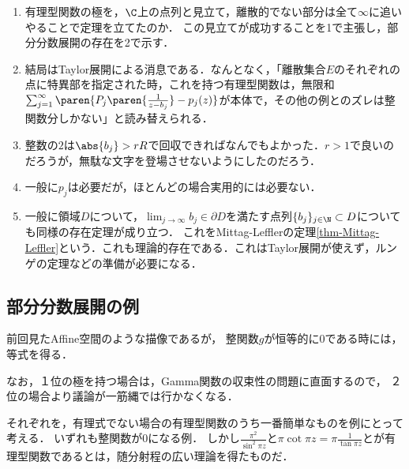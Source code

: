 \documentclass[uplatex, dvipdfmx]{jsreport}
\begin{document}
\begin{remarks}\mbox{}
    \begin{enumerate}
        \item 有理型関数の極を，$\C$上の点列と見立て，離散的でない部分は全て$\infty$に追いやることで定理を立てたのか．
        この見立てが成功することを1で主張し，部分分数展開の存在を2で示す．
        \item 結局はTaylor展開による消息である．なんとなく，「離散集合$E$のそれぞれの点に特異部を指定された時，これを持つ有理型関数は，無限和$\sum^\infty_{j=1}\paren{P_j\paren{\frac{1}{z-b_j}}-p_j(z)}$が本体で，その他の例とのズレは整関数分しかない」と読み替えられる．
        \item 整数の$2$は$\abs{b_j}>rR$で回収できればなんでもよかった．$r>1$で良いのだろうが，無駄な文字を登場させないようにしたのだろう．
        \item 一般に$p_j$は必要だが，ほとんどの場合実用的には必要ない．
        \item 一般に領域$D$について，$\lim_{j\to\infty}b_j\in\partial D$を満たす点列$\{b_j\}_{j\in\N}\subset D$についても同様の存在定理が成り立つ．
        これをMittag-Lefflerの定理\ref{thm-Mittag-Leffler}という．これも理論的存在である．これはTaylor展開が使えず，ルンゲの定理などの準備が必要になる．
    \end{enumerate}
\end{remarks}

\subsection{部分分数展開の例}

\begin{tcolorbox}[colframe=ForestGreen, colback=ForestGreen!10!white, breakable ,colbacktitle=ForestGreen!40!white, coltitle=black,fonttitle=\bfseries\sffamily,
    title=有理型関数の部分分数展開]
    前回見たAffine空間のような描像であるが，
    整関数$g$が恒等的に$0$である時には，等式を得る．

    なお，１位の極を持つ場合は，Gamma関数の収束性の問題に直面するので，
    ２位の場合より議論が一筋縄では行かなくなる．
    
    それぞれを，有理式でない場合の有理型関数のうち一番簡単なものを例にとって考える．
    いずれも整関数が$0$になる例．
    しかし$\frac{\pi^2}{\sin^2\pi z}$と$\pi\cot\pi z=\pi\frac{1}{\tan\pi z}$とが有理型関数であるとは，随分射程の広い理論を得たものだ．
\end{tcolorbox}
\end{document}
